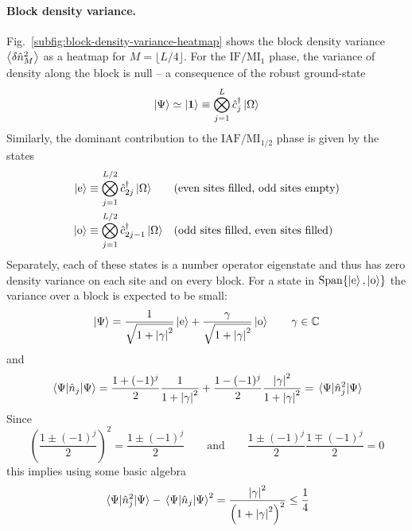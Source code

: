 \paragraph{Block density variance.} Fig.~\ref{subfig:block-density-variance-heatmap} shows the block density variance $\ev{ \delta \hat n_{M}^2 }$ as a heatmap for $M = \lfloor L/4 \rfloor$. For the $\mathrm{IF}/\mathrm{MI}_1$ phase, the variance of density along the block is null -- a consequence of the robust ground-state
\[
	\ket{\Psi} \simeq \ket{\bm{1}} \equiv \bigotimes_{j=1}^L \hat c_j^\dagger \ket{\Omega}
\]
Similarly, the dominant contribution to the $\mathrm{IAF}/\mathrm{MI}_{1/2}$ phase is given by the states
\begin{align}
	\ket{\mathrm{e}} &\equiv \bigotimes_{j=1}^{L/2} \hat c_{2j}^\dagger \ket{\Omega}
	&&\text{(even sites filled, odd sites empty)}
	\label{eq:even-state-definition}
	\\
	\ket{\mathrm{o}} &\equiv \bigotimes_{j=1}^{L/2} \hat c_{2j-1}^\dagger \ket{\Omega}
	&&\text{(odd sites filled, even sites filled)}
	\label{eq:odd-state-definition}
\end{align}
Separately, each of these states is a number operator eigenstate and thus has zero density variance on each site and on every block. For a state in $\mathrm{Span}\lbrace \ket{\mathrm{e}}, \ket{\mathrm{o}} \rbrace$ the variance over a block is expected to be small:
\[
	\ket{\Psi} = \frac{1}{\sqrt{1 + \abs{\gamma}^2}} \ket{\mathrm{e}} + \frac{\gamma}{\sqrt{1 + \abs{\gamma}^2}} \ket{\mathrm{o}}
	\qquad
	\gamma \in \mathbb{C}
\]
and
\[
	\mel{\Psi}{\hat n_j}{\Psi} = \frac{1+(-1)^j}{2} \frac{1}{1 + \abs{\gamma}^2} + \frac{1-(-1)^j}{2} \frac{\abs{\gamma}^2}{1 + \abs{\gamma}^2} = 		\mel{\Psi}{\hat n_j^2 }{\Psi}
\]
Since
\[
	\left(
		\frac{1\pm(-1)^j}{2}
	\right)^2 = \frac{1\pm(-1)^j}{2}
	\qquad\text{and}\qquad
	\frac{1\pm(-1)^j}{2} \frac{1\mp(-1)^j}{2} = 0
\]
this implies using some basic algebra
\[
	\mel{\Psi}{\hat n_j^2 }{\Psi} - \mel{\Psi}{\hat n_j}{\Psi}^2 = \frac{\abs{\gamma}^2}{\left(1 + \abs{\gamma}^2\right)^2}  \le \frac{1}{4}
\]
